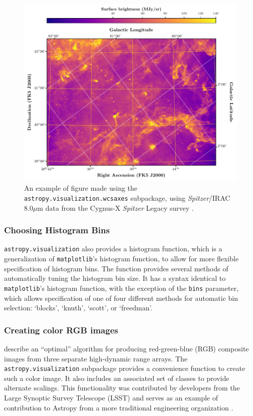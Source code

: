 \documentclass[modern]{aastex61}
\newcommand{\package}[1]{\texttt{#1}\xspace}
\newcommand{\astropy}{Astropy\xspace}
\begin{document}
\begin{figure}
\includegraphics[width=\textwidth]{cygnus_x_spitzer.pdf}
\caption{%
An example of figure made using the \package{astropy.visualization.wcsaxes} subpackage, using \textit{Spitzer}/IRAC 8.0$\mu$m data from the Cygnus-X \textit{Spitzer} Legacy survey \citep{cygnusx}.
\label{fig:wcsaxes}
}
\end{figure}

\subsubsection{Choosing Histogram Bins}

\package{astropy.visualization} also provides a histogram function, which is a
generalization of \package{matplotlib}’s histogram function, to allow for more
flexible specification of histogram bins.  The function provides several methods
of automatically tuning the histogram bin size. It has a syntax identical to
\package{matplotlib}’s histogram function, with the exception of the \texttt{bins}
parameter, which allows specification of one of four different methods for
automatic bin selection: `blocks', `knuth', `scott', or `freedman'.

\subsubsection{Creating color RGB images}

\cite{Lupton2004} describe an ``optimal'' algorithm for producing red-green-blue (RGB) composite images from three separate high-dynamic range arrays. The \package{astropy.visualization} subpackage provides a convenience function to create such a color image.  It also includes an associated set of classes to provide alternate scalings.
This functionality was contributed by developers from the Large Synoptic Survey Telescope (LSST) and serves as an example of contribution to \astropy from a more traditional engineering organization \citep{Jennes2016}.
\end{document}
